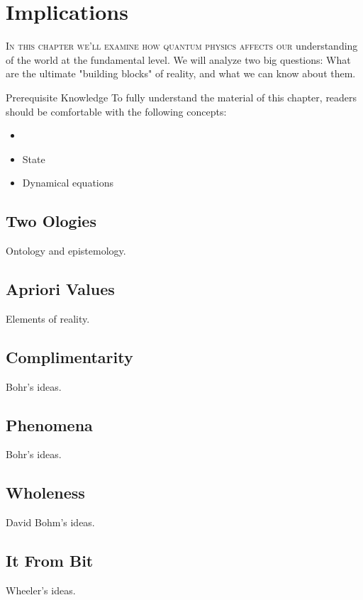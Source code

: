 \graphicspath{{../07Implications/pics/}}

\chapter{Implications}\label{ch:Implications}

\lettrine[lines=2]{\color{darkocre}I}{n this chapter we'll examine how quantum physics affects our} understanding of the world at the fundamental level. We will analyze two big questions: What are the ultimate "building blocks" of reality, and what we can know about them. 

\begin{myprereq}{Prerequisite Knowledge}
	To fully understand the material of this chapter, readers should be comfortable with the following concepts:
	
	\begin{itemize}
		\item \phantom{phantom}
		\vspace{-0.5cm}
		\item State
		\item Dynamical equations
	\end{itemize}	
\end{myprereq}

\section{Two Ologies}
Ontology and epistemology.

\section{Apriori Values}
Elements of reality.

\section{Complimentarity}
Bohr's ideas.

\section{Phenomena}
Bohr's ideas.

\section{Wholeness}
David Bohm's ideas.

\section{It From Bit}
Wheeler's ideas.

